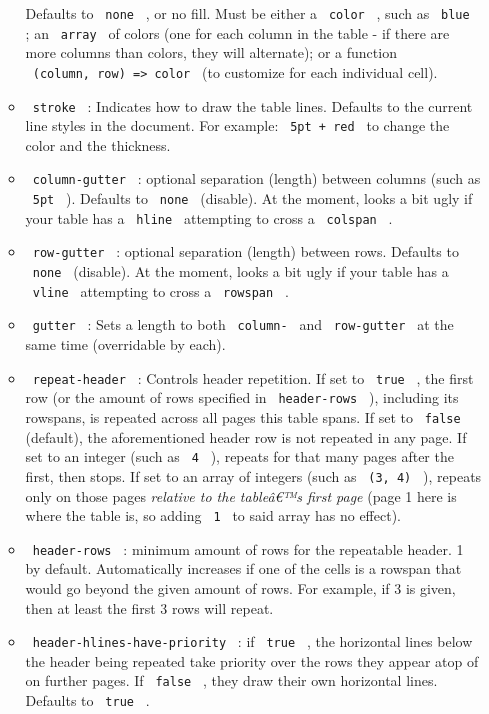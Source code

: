 \begin{enumerate}
\begin{itemize}
    Defaults to \texttt{\ none\ } , or no fill. Must be either a
    \texttt{\ color\ } , such as \texttt{\ blue\ } ; an
    \texttt{\ array\ } of colors (one for each column in the table - if
    there are more columns than colors, they will alternate); or a
    function \texttt{\ (column,\ row)\ =\textgreater{}\ color\ } (to
    customize for each individual cell).
  \item
    \texttt{\ stroke\ } : Indicates how to draw the table lines.
    Defaults to the current line styles in the document. For example:
    \texttt{\ 5pt\ +\ red\ } to change the color and the thickness.
  \item
    \texttt{\ column-gutter\ } : optional separation (length) between
    columns (such as \texttt{\ 5pt\ } ). Defaults to \texttt{\ none\ }
    (disable). At the moment, looks a bit ugly if your table has a
    \texttt{\ hline\ } attempting to cross a \texttt{\ colspan\ } .
  \item
    \texttt{\ row-gutter\ } : optional separation (length) between rows.
    Defaults to \texttt{\ none\ } (disable). At the moment, looks a bit
    ugly if your table has a \texttt{\ vline\ } attempting to cross a
    \texttt{\ rowspan\ } .
  \item
    \texttt{\ gutter\ } : Sets a length to both \texttt{\ column-\ } and
    \texttt{\ row-gutter\ } at the same time (overridable by each).
  \item
    \texttt{\ repeat-header\ } : Controls header repetition. If set to
    \texttt{\ true\ } , the first row (or the amount of rows specified
    in \texttt{\ header-rows\ } ), including its rowspans, is repeated
    across all pages this table spans. If set to \texttt{\ false\ }
    (default), the aforementioned header row is not repeated in any
    page. If set to an integer (such as \texttt{\ 4\ } ), repeats for
    that many pages after the first, then stops. If set to an array of
    integers (such as \texttt{\ (3,\ 4)\ } ), repeats only on those
    pages \emph{relative to the tableâ€™s first page} (page 1 here is
    where the table is, so adding \texttt{\ 1\ } to said array has no
    effect).
  \item
    \texttt{\ header-rows\ } : minimum amount of rows for the repeatable
    header. 1 by default. Automatically increases if one of the cells is
    a rowspan that would go beyond the given amount of rows. For
    example, if 3 is given, then at least the first 3 rows will repeat.
  \item
    \texttt{\ header-hlines-have-priority\ } : if \texttt{\ true\ } ,
    the horizontal lines below the header being repeated take priority
    over the rows they appear atop of on further pages. If
    \texttt{\ false\ } , they draw their own horizontal lines. Defaults
    to \texttt{\ true\ } .


\end{itemize}
\end{enumerate}
